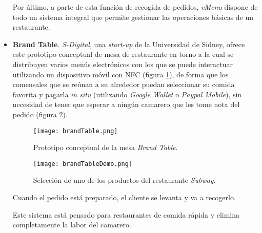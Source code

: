 \begin{itemize}
    Por último, a parte de esta función de recogida de pedidos, \emph{vMenu} 
    dispone de todo un sistema integral que permite gestionar las operaciones
    básicas de un restaurante\cite{bib:VMENU}.

    \item \textbf{Brand Table}. \emph{S-Digital}, una \emph{start-up} de la
    Universidad de Sidney, ofrece este prototipo conceptual de mesa de
    restaurante en torno a la cual se distribuyen varios menús electrónicos con
    los que se puede interactuar utilizando un dispositivo móvil con \acs{NFC}
    (figura \ref{fig:brandTable}), de forma que los comensales que se reúnan a 
    su alrededor puedan seleccionar su comida favorita y pagarla
    \emph{in situ} (utilizando \emph{Google Wallet} o \emph{Paypal Mobile}), 
    sin necesidad de tener que esperar a ningún camarero que les tome nota del 
    pedido (figura \ref{fig:brandTableDemo}).

    \begin{figure}[!h]
      \begin{center}
        \texttt{[image: brandTable.png]}
        \caption{Prototipo conceptual de la mesa \emph{Brand Table}.}
        \label{fig:brandTable}
      \end{center}
    \end{figure}

    \begin{figure}[!h]
      \begin{center}
        \texttt{[image: brandTableDemo.png]}
        \caption{Selección de uno de los productos del restaurante
        \emph{Subway}.}
        \label{fig:brandTableDemo}
      \end{center}
    \end{figure}

    Cuando el pedido está preparado, el cliente se levanta y va a recogerlo.
    
    Este sistema está pensado para restaurantes de comida rápida y elimina
    completamente la labor del camarero\cite{bib:brandTable}.
    \end{itemize}


